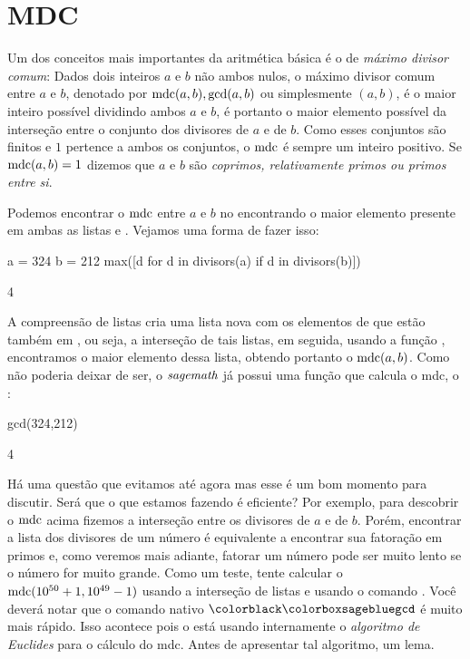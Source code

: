 \section{MDC}
\label{sec:mdc}
Um dos conceitos mais importantes da aritmética básica
é o de \emph{máximo divisor comum}: Dados dois inteiros
$a$ e $b$ não ambos nulos, o máximo divisor comum
entre $a$ e $b$, denotado por $\operatorname{mdc}(a,b), \gcd(a,b)$
ou simplesmente $(a,b)$, é o maior inteiro
possível dividindo ambos $a$ e $b$, é portanto 
o maior elemento possível da interseção entre
o conjunto dos divisores de $a$ e de $b$.
Como esses conjuntos são finitos e $1$ pertence
a ambos os conjuntos, o $\operatorname{mdc}$ é sempre um
inteiro positivo. Se $\operatorname{mdc}(a,b) = 1$
dizemos que $a$ e $b$ são \emph{coprimos, relativamente
primos ou primos entre si}.

Podemos encontrar o $\operatorname{mdc}$ entre $a$
e $b$ no \Sage encontrando o maior elemento presente
em ambas as listas  e . 
Vejamos uma forma de fazer isso:
\begin{sageinput}
a = 324
b = 212
max([d for d in divisors(a) if d in divisors(b)])
\end{sageinput}
\begin{sageoutput}
4
\end{sageoutput}
A compreensão de listas
cria uma lista nova com os elementos
de  que estão também em ,
ou seja, a interseção de tais listas, em seguida,
usando a função , encontramos
o maior elemento dessa lista, obtendo portanto o $\operatorname{mdc}(a,b)$.
Como não poderia deixar de ser, o $\emph{sagemath}$ já possui uma
função que calcula o mdc, o :
\begin{sageinput}
gcd(324,212)
\end{sageinput}
\begin{sageoutput}
4
\end{sageoutput}

Há uma questão que evitamos até agora mas esse é um
bom momento para discutir. Será que o que estamos fazendo
é eficiente? Por exemplo, para descobrir o $\operatorname{mdc}$ acima
fizemos a interseção entre os divisores de $a$ e de $b$.
Porém, encontrar a lista dos divisores de um número
é equivalente a encontrar sua fatoração em primos e,
como veremos mais adiante, fatorar um número pode
ser muito lento se o número for muito grande. Como
um teste, tente calcular o  $\operatorname{mdc}(10^{50}+1, 10^{49}-1)$
usando a interseção de listas e usando o comando
. Você deverá notar que o comando
nativo $\ils{gcd}$ é muito mais rápido. Isso acontece
pois o \Sage está usando internamente o 
\emph{algoritmo de Euclides} para o cálculo do mdc.
Antes de apresentar tal algoritmo, um lema.

